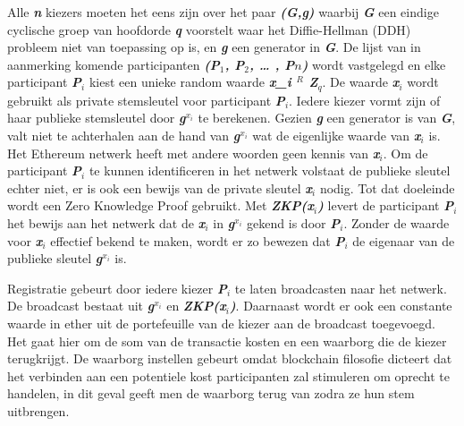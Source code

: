 			Alle \textbf{\textit{n}} kiezers moeten het eens zijn over het paar \textbf{\textit{(G,g)}} waarbij \textbf{\textit{G}} een eindige cyclische groep van hoofdorde \textbf{\textit{q}} voorstelt waar het Diffie-Hellman (DDH) probleem niet van toepassing op is, en \textbf{\textit{g}} een generator in \textbf{\textit{G}}. De lijst van in aanmerking komende participanten \textbf{\textit{(P$_{1}$, P$_{2}$, … , P${n}$)}} wordt vastgelegd en elke participant \textbf{\textit{P$_{i}$}} kiest een unieke random waarde  \textbf{\textit{x_{i} \in $^{R}$ Z$_{q}$}}. De waarde \textbf{\textit{x$_{i}$}} wordt gebruikt als private stemsleutel voor participant \textbf{\textit{P$_{i}$}}.  Iedere kiezer vormt zijn of haar publieke stemsleutel door \textbf{\textit{g$^{x_{i}}$}} te berekenen. Gezien \textbf{\textit{g}} een generator is van \textbf{\textit{G}}, valt niet te achterhalen aan de hand van \textbf{\textit{g$^{x_{i}}$}} wat de eigenlijke waarde van \textbf{\textit{x$_{i}$}} is. Het Ethereum netwerk heeft met andere woorden geen kennis van \textbf{\textit{x$_{i}$}}. Om de participant \textbf{\textit{P$_{i}$}} te kunnen identificeren in het netwerk volstaat de publieke sleutel echter niet, er is ook een bewijs van de private sleutel \textbf{\textit{x$_{i}$}} nodig. Tot dat doeleinde wordt een Zero Knowledge Proof gebruikt. Met \textbf{\textit{ZKP(x$_{i}$)}} levert de participant \textbf{\textit{P$_{i}$}}  het bewijs aan het netwerk dat de \textbf{\textit{x$_{i}$}}  in \textbf{\textit{g$^{x_{i}}$}} gekend is door \textbf{\textit{P$_{i}$}}. Zonder de waarde voor \textbf{\textit{x$_{i}$}}  effectief bekend te maken, wordt er zo bewezen dat \textbf{\textit{P$_{i}$}} de eigenaar van de publieke sleutel \textbf{\textit{g$^{x_{i}}$}} is.
			
			Registratie gebeurt door iedere kiezer \textbf{\textit{P$_{i}$}} te laten broadcasten naar het netwerk. De broadcast bestaat uit \textbf{\textit{g$^{x_{i}}$}}  en \textbf{\textit{ZKP(x$_{i}$)}}. Daarnaast wordt er ook een constante waarde in ether uit de portefeuille van de kiezer aan de broadcast toegevoegd. Het gaat hier om de som van de transactie kosten en een waarborg die de kiezer terugkrijgt. De waarborg instellen gebeurt omdat blockchain filosofie dicteert dat het verbinden aan een potentiele kost participanten zal stimuleren om oprecht te handelen, in dit geval geeft men de waarborg terug van zodra ze hun stem uitbrengen. 
			
